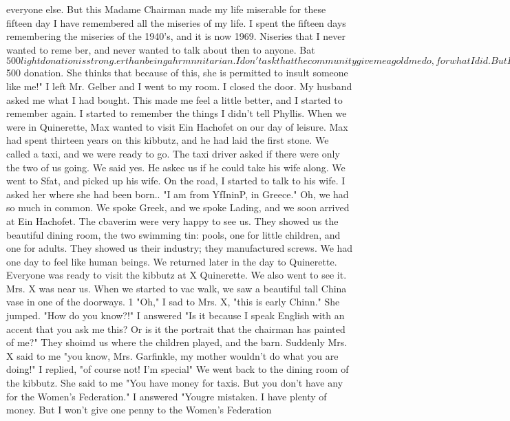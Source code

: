 {everyone else. But this Madame Chairman made my life miserable for these fifteen day 
I have remembered all the miseries of my life. I spent the fifteen days remembering 
the miseries of the 1940's, and it is now 1969. Niseries that I never wanted to reme 
ber, and never wanted to talk about then to anyone. Bat $500 light donation is strong. 
er than being a hrmnnitarian. I don't ask that the community give me a gold medo, for 
what I did. But I will not let myself be insulted any more, especially when it is 
owing from some ignorant person because she gave SAR a $500 donation. She thinks 
that because of this, she is permitted to insult someone like me!" 
I left Mr. Gelber and I went to my room. I closed the door. My husband asked 
me what I had bought. This made me feel a little better, and I started to remember 
again. 
I started to remember the things I didn't tell Phyllis. When we were in Quinerette, 
Max wanted to visit Ein Hachofet on our day of leisure. Max had spent thirteen years 
on this kibbutz, and he had laid the first stone. We called a taxi, and we were ready to 
go. The taxi driver asked if there were only the two of us going. We said yes. He askec 
us if he could take his wife along. We went to Sfat, and picked up his wife. 
On the road, I started to talk to his wife. I asked her where she had been born.. 
"I am from YfIninP, in Greece." Oh, we had so much in common. We spoke Greek, and we 
spoke Lading, and we soon arrived at Ein Hachofet. 
The cbaverim were very happy to see us. They showed us the beautiful dining room, 
the two swimming tin: pools, one for little children, and one for adults. They showed 
us their industry; they manufactured screws. We had one day to feel like human beings. 
We returned later in the day to Quinerette. 
Everyone was ready to visit the kibbutz at X Quinerette. We also went to see it. 
Mrs. X was near us. When we started to vac walk, we saw a beautiful tall China vase in 
one of the doorways. 1 
"Oh," I sad to Mrs. X, "this is early Chinn." 
She jumped. "How do you know?!" 
I answered "Is it because I speak English with an accent that you ask me this? Or 
is it the portrait that the chairman has painted of me?" 
They shoimd us where the children played, and the barn. Suddenly Mrs. X said to me 
"you know, Mrs. Garfinkle, my mother wouldn't do what you are doing!" I replied, "of 
course not! I'm special" 
We went back to the dining room of the kibbutz. She said to me "You have money 
for taxis. But you don't have any for the Women's Federation." I answered "Yougre 
mistaken. I have plenty of money. But I won't give one penny to the Women's Federation 
}
